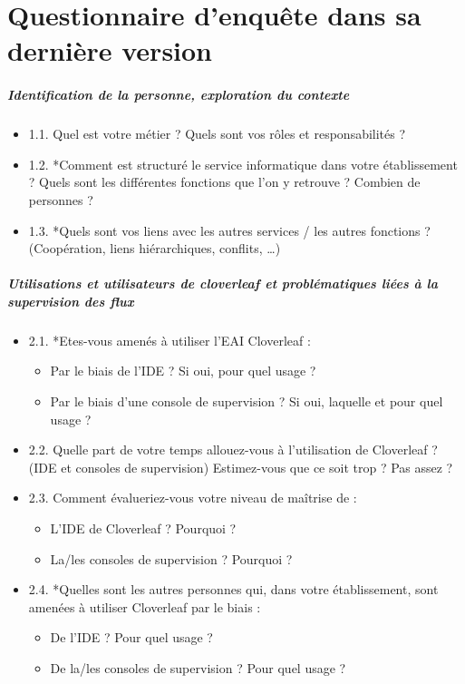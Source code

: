\tocless\chapter{Questionnaire d'enquête dans sa dernière version}
	\paragraph{Identification de la personne, exploration du contexte}
	\begin{itemize}
	  \item 1.1. Quel est votre métier ? Quels sont vos rôles et responsabilités ?
	  \item 1.2. *Comment est structuré le service informatique dans votre
	  établissement ? Quels sont les différentes fonctions que l’on y retrouve ? Combien de personnes ?
	  \item 1.3. *Quels sont vos liens avec les autres services / les autres
	  fonctions ? (Coopération, liens hiérarchiques, conflits, …)
	\end{itemize}
	
	\paragraph{Utilisations et utilisateurs de cloverleaf et problématiques liées à
	la supervision des flux}
	\begin{itemize}
	  \item 2.1. *Etes-vous amenés à utiliser l’EAI Cloverleaf :
	  	\begin{itemize}
	  	  \item Par le biais de l’IDE ? Si oui, pour quel usage ?
	  	  \item Par le biais d’une console de supervision ? Si oui, laquelle et pour
	  	  quel usage ?
	  	\end{itemize}
	   \item 2.2. Quelle part de votre temps allouez-vous à l’utilisation de
	   Cloverleaf ? (IDE et consoles de supervision) Estimez-vous que ce soit trop ? Pas assez ?
	   \item 2.3. Comment évalueriez-vous votre niveau de maîtrise de :
	   	\begin{itemize}
	  	  \item L’IDE de Cloverleaf ? Pourquoi ?
	  	  \item La/les consoles de supervision ? Pourquoi ?
	  	\end{itemize}
	   \item 2.4. *Quelles sont les autres personnes qui, dans votre établissement,
	   sont amenées à utiliser Cloverleaf par le biais :
	   	\begin{itemize}
	  	  \item De l’IDE ? Pour quel usage ?
	  	  \item De la/les consoles de supervision ? Pour quel usage ?
	  	\end{itemize}
	\end{itemize}
	
